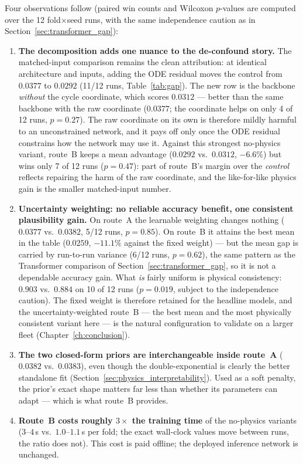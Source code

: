 Four observations follow (paired win counts and Wilcoxon $p$-values are
computed over the 12 fold$\times$seed runs, with the same independence caution
as in Section~\ref{sec:transformer_gap}):
\begin{enumerate}
    \item \textbf{The decomposition adds one nuance to the de-confound story.}
    The matched-input comparison remains the clean attribution: at identical
    architecture and inputs, adding the ODE residual moves the control from
    $0.0377$ to $0.0292$ (11/12 runs, Table~\ref{tab:gap}). The new row is the
    backbone \emph{without} the cycle coordinate, which scores $0.0312$ ---
    better than the same backbone with the raw coordinate ($0.0377$; the
    coordinate helps on only 4 of 12 runs, $p=0.27$). The raw coordinate on
    its own is therefore mildly harmful to an unconstrained network, and it
    pays off only once the ODE residual constrains how the network may use
    it. Against this strongest no-physics variant, route~B keeps a mean
    advantage ($0.0292$ vs.\ $0.0312$, $-6.6\%$) but wins only 7 of 12 runs
    ($p=0.47$): part of route~B's margin over the \emph{control} reflects
    repairing the harm of the raw coordinate, and the like-for-like physics
    gain is the smaller matched-input number.
    \item \textbf{Uncertainty weighting: no reliable accuracy benefit, one
    consistent plausibility gain.} On route~A the learnable weighting changes
    nothing ($0.0377$ vs.\ $0.0382$, 5/12 runs, $p=0.85$). On route~B it
    attains the best mean in the table ($0.0259$, $-11.1\%$ against the fixed
    weight) --- but the mean gap is carried by run-to-run variance (6/12
    runs, $p=0.62$), the same pattern as the Transformer comparison of
    Section~\ref{sec:transformer_gap}, so it is not a dependable accuracy
    gain. What \emph{is} fairly uniform is physical consistency: $0.903$ vs.\
    $0.884$ on 10 of 12 runs ($p=0.019$, subject to the independence
    caution). The fixed weight is therefore retained for the headline models,
    and the uncertainty-weighted route~B --- the best mean and the most
    physically consistent variant here --- is the natural configuration to
    validate on a larger fleet (Chapter~\ref{ch:conclusion}).
    \item \textbf{The two closed-form priors are interchangeable inside
    route~A} ($0.0382$ vs.\ $0.0383$), even though the double-exponential is
    clearly the better standalone fit
    (Section~\ref{sec:physics_interpretability}). Used as a soft penalty, the
    prior's exact shape matters far less than whether its parameters can
    adapt --- which is what route~B provides.
    \item \textbf{Route~B costs roughly $3\times$ the training time} of the
    no-physics variants ($3$--$4$\,s vs.\ $1.0$--$1.1$\,s per fold; the exact
    wall-clock values move between runs, the ratio does not). This cost is
    paid offline; the deployed inference network is unchanged.
\end{enumerate}

